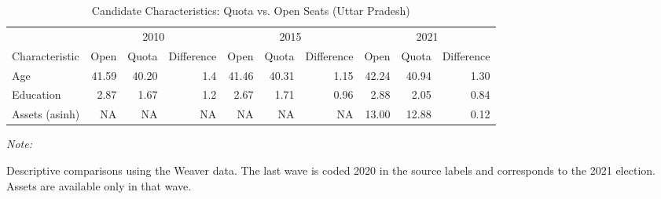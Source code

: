 \begin{table}
\centering
\caption{\label{tab:up_cand_char}Candidate Characteristics: Quota vs. Open Seats (Uttar Pradesh)}
\centering
\fontsize{8}{10}\selectfont
\begin{threeparttable}
\begin{tabular}[t]{lrrrrrrrrr}
\toprule
\multicolumn{1}{c}{ } & \multicolumn{3}{c}{2010} & \multicolumn{3}{c}{2015} & \multicolumn{3}{c}{2021} \\
\cmidrule(l{3pt}r{3pt}){2-4} \cmidrule(l{3pt}r{3pt}){5-7} \cmidrule(l{3pt}r{3pt}){8-10}
Characteristic & Open & Quota & Difference & Open & Quota & Difference & Open & Quota & Difference\\
\midrule
Age & 41.59 & 40.20 & 1.4 & 41.46 & 40.31 & 1.15 & 42.24 & 40.94 & 1.30\\
Education & 2.87 & 1.67 & 1.2 & 2.67 & 1.71 & 0.96 & 2.88 & 2.05 & 0.84\\
Assets (asinh) & NA & NA & NA & NA & NA & NA & 13.00 & 12.88 & 0.12\\
\bottomrule
\end{tabular}
\begin{tablenotes}
\item \textit{Note: } 
\item Descriptive comparisons using the Weaver data. The last wave is coded 2020 in the source labels and corresponds to the 2021 election. Assets are available only in that wave.
\end{tablenotes}
\end{threeparttable}
\end{table}

